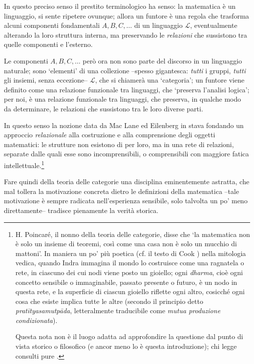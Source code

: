 In questo preciso senso il prestito terminologico ha senso: la matematica è un linguaggio, si sente ripetere ovunque; allora un funtore è una regola che trasforma alcuni componenti fondamentali \(A,B,C,\dots\) di un linguaggio \(\mathcal{L}\), eventualmente alterando la loro struttura interna, ma preservando le \emph{relazioni} che sussistono tra quelle componenti e l'esterno.

Le componenti \(A,B,C,\dots\) però ora non sono parte del discorso in un linguaggio naturale; sono `elementi' di una collezione --spesso gigantesca: \emph{tutti} i gruppi, \emph{tutti} gli insiemi, senza eccezione-- \(\mathcal{L}\), che si chiamerà una `categoria'; un funtore viene definito come una relazione funzionale tra linguaggi, che `preserva l'analisi logica'; per noi, è una relazione funzionale tra linguaggi, che preserva, in qualche modo da determinare, le relazioni che sussistono tra le loro diverse parti.

In questo senso la nozione data da Mac Lane ed Eilenberg in \cite{gtone} stava fondando un approccio \emph{relazionale} alla costruzione e alla comprensione degli oggetti matematici: le strutture non esistono di per loro, ma in una rete di relazioni, separate dalle quali esse sono incomprensibili, o comprensibili con maggiore fatica intellettuale.\footnote{H. Poincaré, il nonno della teoria delle categorie, disse che `la matematica non è solo un insieme di teoremi, così come una casa non è solo un mucchio di mattoni'. In maniera un po' più poetica (cf. il testo di Cook \cite{Cook1977-ry}) nella mitologia vedica, quando Indra immagina il mondo lo costruisce come una ragnatela o rete, in ciascuno dei cui nodi viene posto un gioiello; ogni \emph{dharma}, cioè ogni concetto sensibile o immaginabile, passato presente o futuro, è un nodo in questa rete, e la superficie di ciascun gioiello riflette ogni altro, cosicché ogni cosa che esiste implica tutte le altre (secondo il principio detto \emph{pratītyasamutpāda}, letteralmente traducibile come \emph{mutua produzione condizionata}).

Questa nota non è il luogo adatta ad approfondire la questione dal punto di vista storico o filosofico (e ancor meno lo è questa introduzione); chi legge consulti pure \cite{marquis, kromer}.}

\medskip
Fare quindi della teoria delle categorie una disciplina eminentemente astratta, che mal tollera la motivazione concreta dietro le definizioni della matematica --tale motivazione è sempre radicata nell'esperienza sensibile, solo talvolta un po' meno direttamente-- tradisce pienamente la verità storica.

